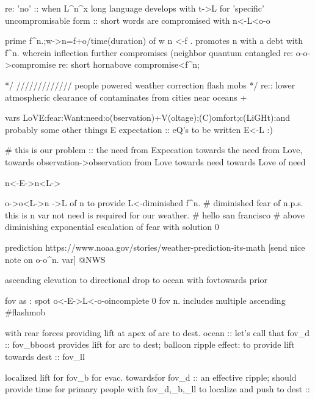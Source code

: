 re: 'no' :: 
when L^n^x{} long language develops with t->{L{}} for 'specific' uncompromisable form
:: short words are compromised with n<-L<o-o{prime f^n.;w->n=f+o/time(duration) of w n <-f . promotes n with a debt with f^n.
wherein inflection further compromises (neighbor quantum entangled re: o-o->{compromise}
re: short horn{above compromise}<f^n;


*/ ///////////// people powered weather correction flash mobs */
  re:: lower atmospheric clearance of contaminates from cities near oceans + {
    {vars}
      LoVE:fear:Want:need:o(bservation)+V(oltage);(C)omfort;c(LiGHt):and probably some other things
      E expectation :: eQ's to be written {E<-L :)}

# this is our problem :: the need from Expecation towards the need from Love, towards {observation->observation from Love towards need { towards Love of need}}

  n<-E->n<L-> {o->o<L->n {{ ->L of n }}
    to provide L<-diminished f^n. # diminished fear of n.{p.s. this is n var not need} is required for our weather.
    # hello san francisco
    # above {diminishing exponential escalation of fear} with {solution 0}


{prediction} https://www.noaa.gov/stories/weather-prediction-its-math [send nice note on o-o^n. {var}] @NWS

{ascending elevation to directional drop to {ocean} with fov{towards prior}{fov as  : spot o<-E->L<-o-o{incomplete 0}
fov n. includes {multiple} {ascending} #flashmob {with rear forces providing lift at apex of arc to dest. {ocean}
  :: let's call that fov_d
  :: fov_b{boost} provides lift for arc to dest;  balloon ripple effect: to provide lift towards dest
  :: fov_ll{localized lift for fov_b for evac. towards{for} fov_d
  :: an effective ripple; should provide time for primary people with fov_d,_b,_ll to localize and push to dest
:: 


}}}}}}}
